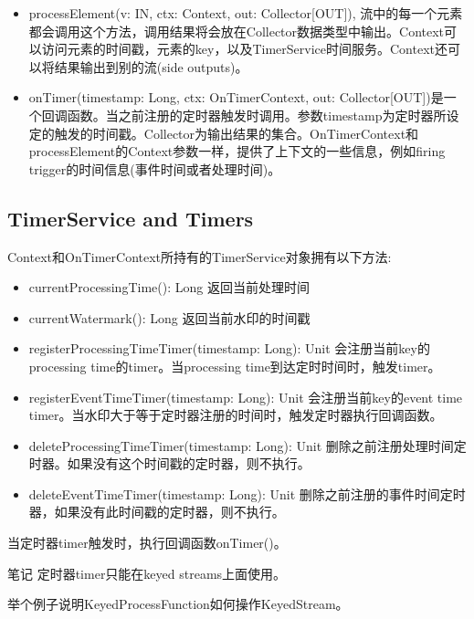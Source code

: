\documentclass[oneside]{ctexbook}
\begin{document}
\begin{itemize}
\item processElement(v: IN, ctx: Context, out: Collector[OUT]), 流中的每一个元素都会调用这个方法，调用结果将会放在Collector数据类型中输出。Context可以访问元素的时间戳，元素的key，以及TimerService时间服务。Context还可以将结果输出到别的流(side outputs)。
\item onTimer(timestamp: Long, ctx: OnTimerContext, out: Collector[OUT])是一个回调函数。当之前注册的定时器触发时调用。参数timestamp为定时器所设定的触发的时间戳。Collector为输出结果的集合。OnTimerContext和processElement的Context参数一样，提供了上下文的一些信息，例如firing trigger的时间信息(事件时间或者处理时间)。
\end{itemize}

\subsection{TimerService and Timers}

Context和OnTimerContext所持有的TimerService对象拥有以下方法:

\begin{itemize}
\item currentProcessingTime(): Long 返回当前处理时间
\item currentWatermark(): Long 返回当前水印的时间戳
\item registerProcessingTimeTimer(timestamp: Long): Unit 会注册当前key的processing time的timer。当processing time到达定时时间时，触发timer。
\item registerEventTimeTimer(timestamp: Long): Unit 会注册当前key的event time timer。当水印大于等于定时器注册的时间时，触发定时器执行回调函数。
\item deleteProcessingTimeTimer(timestamp: Long): Unit 删除之前注册处理时间定时器。如果没有这个时间戳的定时器，则不执行。
\item deleteEventTimeTimer(timestamp: Long): Unit 删除之前注册的事件时间定时器，如果没有此时间戳的定时器，则不执行。
\end{itemize}

当定时器timer触发时，执行回调函数onTimer()。

\begin{bclogo}[logo=\bcinfo, couleurBarre=orange, noborder=true, couleur=white]{笔记}
定时器timer只能在keyed streams上面使用。
\end{bclogo}

举个例子说明KeyedProcessFunction如何操作KeyedStream。
\end{document}
